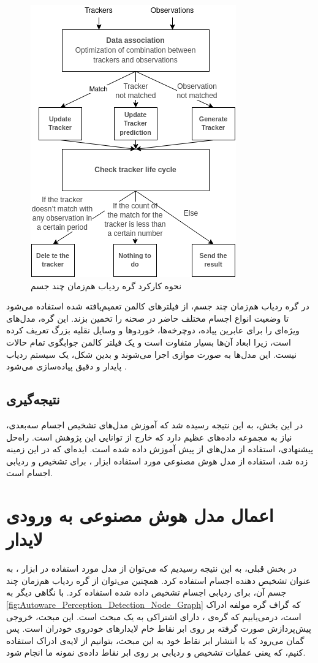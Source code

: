 \begin{figure}[h!]
    \centering
    \includegraphics[width=0.5\linewidth]{figures/Autoware_Multi_Object_Tracking_Architecture.png}
    \caption{نحوه کارکرد گره ردیاب هم‌زمان چند جسم}
    \label{fig:Autoware_Multi_Object_Tracker}
\end{figure}

در گره ردیاب هم‌زمان چند جسم، از فیلتر‌های کالمن تعمیم‌یافته شده استفاده 
می‌شود تا وضعیت انواع اجسام مختلف حاضر در صحنه را تخمین بزند. این گره، مدل‌های ویژه‌ای را برای عابرین پیاده، دوچرخه‌‌ها، خوردو‌ها و وسایل نقلیه بزرگ تعریف کرده است، زیرا ابعاد آن‌ها بسیار متفاوت است و یک فیلتر کالمن جوابگوی تمام حالات نیست. این مدل‌ها به صورت موازی اجرا می‌شوند و بدین شکل، یک سیستم ردیاب پایدار و دقیق پیاده‌سازی می‌شود \cite{AWSIM:Documentation}.

\subsection{نتیجه‌گیری}
در این بخش، به این نتیجه رسیده شد که آموزش مدل‌های تشخیص اجسام سه‌بعدی، نیاز به مجموعه داده‌های عظیم دارد که خارج از توانایی این پژوهش است. راه‌حل پیشنهادی، استفاده از مدل‌های از پیش آموزش داده شده است. ایده‌ای که در این زمینه زده شد، استفاده از مدل هوش مصنوعی مورد استفاده ابزار ، برای تشخیص و ردیابی اجسام است. 

\section{اعمال مدل هوش‌ مصنوعی به ورودی لایدار}
در بخش قبلی، به این نتیجه رسیدیم که می‌توان از مدل‌  مورد استفاده در ابزار ، به عنوان تشخیص دهنده اجسام استفاده کرد. همچنین می‌توان از گره ردیاب هم‌زمان چند جسم آن، برای ردیابی اجسام تشخیص داده شده استفاده کرد. با نگاهی دیگر به \cref{fig:Autoware_Perception_Detection_Node_Graph} که گراف گره مولفه ادراک است، درمی‌یابیم که گره‌ی ، دارای اشتراکی به یک مبحث است. این مبحث، خروجی پیش‌پردازش صورت گرفته بر روی ابر نقاط خام لایدار‌های خودروی خودران است. پس گمان می‌رود که با انتشار ابر نقاط خود به این مبحث، بتوانیم از لایه‌ی ادراک استفاده کنیم، که یعنی عملیات تشخیص و ردیابی بر روی ابر نقاط داده‌ی نمونه ما انجام شود.

